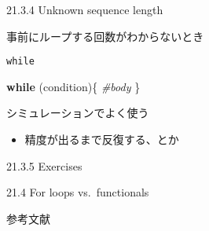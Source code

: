 \documentclass[ignorenonframetext,]{beamer}
\newenvironment{Shaded}{\begin{snugshade}}{\end{snugshade}}
\newcommand{\CommentTok}[1]{\textcolor[rgb]{0.56,0.35,0.01}{\textit{#1}}}
\newcommand{\ControlFlowTok}[1]{\textcolor[rgb]{0.13,0.29,0.53}{\textbf{#1}}}
\newcommand{\NormalTok}[1]{#1}
\providecommand{\tightlist}{%
  \setlength{\itemsep}{0pt}\setlength{\parskip}{0pt}}
\begin{document}
\begin{frame}{21.3.4 Unknown sequence length}

事前にループする回数がわからないとき

\end{frame}

\begin{frame}[fragile]{\texttt{while}}

\begin{Shaded}
\begin{Highlighting}[]
\ControlFlowTok{while}\NormalTok{ (condition)\{}
  \CommentTok{#body}
\NormalTok{\}}
\end{Highlighting}
\end{Shaded}

シミュレーションでよく使う

\begin{itemize}
\tightlist
\item
  精度が出るまで反復する、とか
\end{itemize}

\end{frame}

\begin{frame}{21.3.5 Exercises}

\end{frame}

\begin{frame}{21.4 For loops vs.~functionals}

\end{frame}

\begin{frame}{参考文献}

\end{frame}
\end{document}
